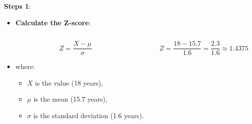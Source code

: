 \documentclass[
  ignorenonframetext,
]{beamer}
\providecommand{\tightlist}{%
  \setlength{\itemsep}{0pt}\setlength{\parskip}{0pt}}
\begin{document}
\begin{frame}{\textbf{Steps 1}:}
\label{steps-1}
\begin{itemize}
\tightlist
\item
  \textbf{Calculate the Z-score}:
\end{itemize}

\begin{columns}[T]
\begin{column}{0.48\textwidth}
\[
   Z = \frac{X - \mu}{\sigma}
   \]

\begin{itemize}
\tightlist
\item
  where:

  \begin{itemize}
  \tightlist
  \item
    \(X\) is the value (18 years),
  \item
    \(\mu\) is the mean (15.7 years),
  \item
    \(\sigma\) is the standard deviation (1.6 years).
  \end{itemize}
\end{itemize}
\end{column}

\begin{column}{0.48\textwidth}
\vspace{1cm}

\[
   Z = \frac{18 - 15.7}{1.6} = \frac{2.3}{1.6} \approx 1.4375
   \]
\end{column}
\end{columns}
\end{frame}
\end{document}
